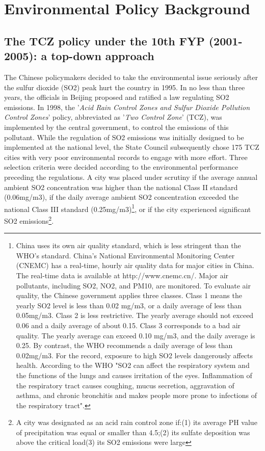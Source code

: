 \documentclass[12pt]{article}
\begin{document}
\section{Environmental Policy Background} \label{policy} 

\subsection{The TCZ policy under the 10th FYP (2001-2005): a top-down approach}

The Chinese policymakers decided to take the environmental issue seriously after the sulfur dioxide (SO2) peak hurt the country in 1995. In no less than three years, the officials in Beijing proposed and ratified a law regulating SO2 emissions. In 1998, the '\textit{Acid Rain Control Zones and Sulfur Dioxide Pollution Control Zones}' policy, abbreviated as '\textit{Two Control Zone}' (TCZ), was implemented by the central government, to control the emissions of this pollutant. While the regulation of SO2 emissions was initially designed to be implemented at the national level, the State Council subsequently chose 175 TCZ cities with very poor environmental records to engage with more effort. Three selection criteria were decided according to the environmental performance preceding the regulations. A city was placed under scrutiny if the average annual ambient SO2 concentration was higher than the national Class II standard (0.06mg/m3), if the daily average ambient SO2 concentration exceeded the national Class III standard (0.25mg/m3)\footnote{ China uses its own air quality standard, which is less stringent than the WHO's standard. China's National Environmental Monitoring Center (CNEMC) has a real-time, hourly air quality data for major cities in China. The real-time data is available at http://www.cnemc.cn/. Major air pollutants, including SO2, NO2, and PM10, are monitored. To evaluate air quality, the Chinese government applies three classes. Class 1 means the yearly SO2 level is less than 0.02 mg/m3, or a daily average of less than 0.05mg/m3. Class 2 is less restrictive. The yearly average should not exceed 0.06 and a daily average of about 0.15. Class 3 corresponds to a bad air quality. The yearly average can exceed 0.10 mg/m3, and the daily average is 0.25. By contrast, the WHO recommends a daily average of less than 0.02mg/m3. For the record, exposure to high SO2 levels dangerously affects health. According to the WHO "SO2 can affect the respiratory system and the functions of the lungs and causes irritation of the eyes. Inflammation of the respiratory tract causes coughing, mucus secretion, aggravation of asthma, and chronic bronchitis and makes people more prone to infections of the respiratory tract".}, or if the city experienced significant SO2 emissions\footnote{ A city was designated as an acid rain control zone if:(1) its average PH value of precipitation was equal or smaller than 4.5;(2) its sulfate deposition was above the critical load(3) its SO2 emissions were large }. 
\end{document}
